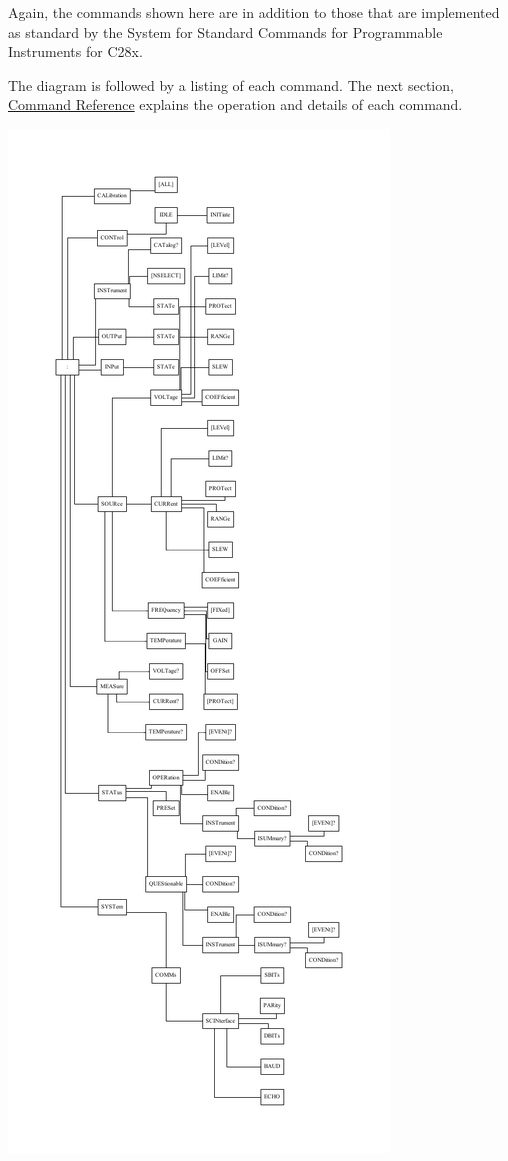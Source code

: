 Again, the commands shown here are in addition to those that are implemented as standard by the System for Standard Commands for Programmable Instruments for C28x.

The diagram is followed by a listing of each command. The next section, \hyperlink{a00002}{Command Reference} explains the operation and details of each command.

\begin{center}

\begin{DoxyImageNoCaption}
  \mbox{\includegraphics[width=\textwidth,height=\textheight/2,keepaspectratio=true]{dot_inline_dotgraph_2}}
\end{DoxyImageNoCaption}
\end{center}
